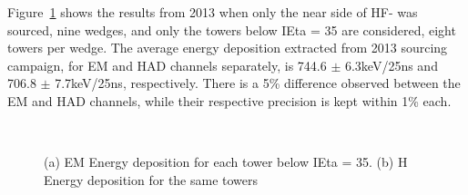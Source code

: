 Figure~\ref{fig:HFM_2013_Res} shows the results from 2013 when only the near side
of HF- was sourced, nine wedges, and only the towers below IEta = 35 are
considered, eight towers per wedge. The average energy deposition extracted from
2013 sourcing campaign, for EM and HAD channels separately, is 744.6 $\pm$ 6.3\unit{keV}/25\unit{ns} and 706.8 $\pm$ 7.7\unit{keV}/25\unit{ns}, respectively. There is a 5\% difference observed between the EM and HAD channels, while their
respective precision is kept within 1\% each.
\begin{figure}[!h]
   \begin{center}
      ~
      \caption{(a) EM Energy deposition for each tower below IEta = 35. (b) H Energy deposition for the same towers}
      \label{fig:HFM_2013_Res}
   \end{center}
\end{figure}


